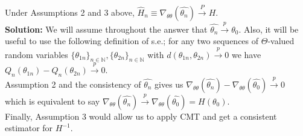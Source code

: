 \documentclass[11pt,letterpaper]{article}                  %
\begin{document}
\bigskip
\begin{problem}
\end{problem}

\bigskip
\begin{problem}
\end{problem}

\bigskip
\begin{problem}
Under Assumptions 2 and 3 above, $\hat{H}_n \equiv \nabla_{\theta\theta}(\widehat{\theta_n}) \overset{P}{\rightarrow} H$.\\

\textbf{Solution:} We will assume throughout the answer that $\widehat{\theta_n}\overset{p}{\rightarrow}\theta_0$. Also, it will be useful to use the following definition of s.e.; for any two sequences of $\Theta$-valued random variables $\{\theta_{1n}\}_{n\in\mathbb{N}}, \{\theta_{2n}\}_{n\in\mathbb{N}}$ with $d(\theta_{1n},\theta_{2n})\overset{p}{\rightarrow}0$ we have $Q_n(\theta_{1n}) - Q_n(\theta_{2n})\overset{p}{\rightarrow}0$.\\

Assumption 2 and the consistency of $\widehat{\theta_n}$ gives us $\nabla_{\theta\theta}(\widehat{\theta_n}) - \nabla_{\theta\theta}(\widehat{\theta_0}) \overset{p}{\rightarrow}0$ which is equivalent to say $\nabla_{\theta\theta}(\widehat{\theta_n}) \overset{p}{\rightarrow} \nabla_{\theta\theta}(\widehat{\theta_0}) = H(\theta_0)$.\\

Finally, Assumption 3 would allow us to apply CMT and get a consistent estimator for $H^{-1}$.
\end{problem}
\end{document}
